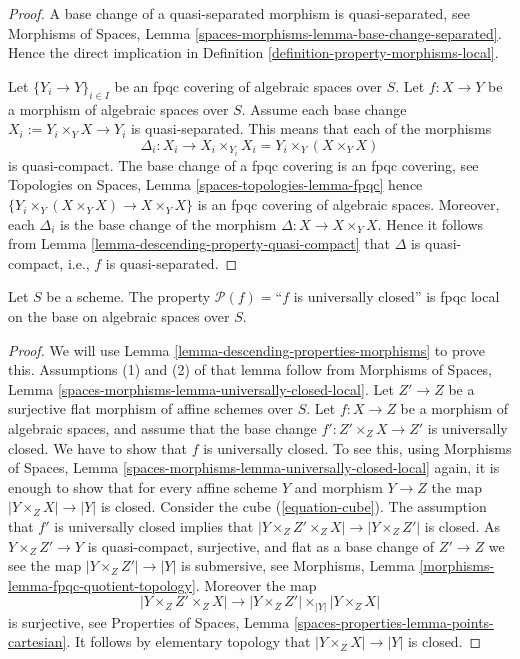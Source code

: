 \begin{proof}
A base change of a quasi-separated morphism is quasi-separated, see
Morphisms of Spaces,
Lemma \ref{spaces-morphisms-lemma-base-change-separated}.
Hence the direct implication in
Definition \ref{definition-property-morphisms-local}.

\medskip\noindent
Let $\{Y_i \to Y\}_{i \in I}$ be an fpqc covering of algebraic spaces over $S$.
Let $f : X \to Y$ be a morphism of algebraic spaces over $S$.
Assume each base change $X_i := Y_i \times_Y X \to Y_i$ is quasi-separated.
This means that each of the morphisms
$$
\Delta_i :
X_i
\longrightarrow
X_i \times_{Y_i} X_i = Y_i \times_Y (X \times_Y X)
$$
is quasi-compact. The base change of a fpqc covering is an fpqc covering, see
Topologies on Spaces, Lemma \ref{spaces-topologies-lemma-fpqc}
hence $\{Y_i \times_Y (X \times_Y X) \to X \times_Y X\}$
is an fpqc covering of algebraic spaces. Moreover, each
$\Delta_i$ is the base change of the morphism
$\Delta : X \to X \times_Y X$. Hence it follows from
Lemma \ref{lemma-descending-property-quasi-compact}
that $\Delta$ is quasi-compact, i.e., $f$ is quasi-separated.
\end{proof}

\begin{lemma}
\label{lemma-descending-property-universally-closed}
Let $S$ be a scheme.
The property $\mathcal{P}(f) =$``$f$ is universally closed''
is fpqc local on the base on algebraic spaces over $S$.
\end{lemma}

\begin{proof}
We will use
Lemma \ref{lemma-descending-properties-morphisms}
to prove this. Assumptions (1) and (2) of that lemma follow from
Morphisms of Spaces,
Lemma \ref{spaces-morphisms-lemma-universally-closed-local}.
Let $Z' \to Z$ be a surjective flat morphism of affine schemes over $S$.
Let $f : X \to Z$ be a morphism of algebraic spaces, and assume
that the base change $f' : Z' \times_Z X \to Z'$ is universally closed.
We have to show that $f$ is universally closed. To see this, using
Morphisms of Spaces,
Lemma \ref{spaces-morphisms-lemma-universally-closed-local}
again, it is enough to show that for every affine scheme $Y$ and
morphism $Y \to Z$ the map $|Y \times_Z X| \to |Y|$ is closed.
Consider the cube (\ref{equation-cube}).
The assumption that $f'$ is universally closed implies that
$|Y \times_Z Z' \times_Z X| \to |Y \times_Z Z'|$ is closed.
As $Y \times_Z Z' \to Y$ is quasi-compact, surjective, and flat
as a base change of $Z' \to Z$
we see the map $|Y \times_Z Z'| \to |Y|$ is submersive, see
Morphisms, Lemma \ref{morphisms-lemma-fpqc-quotient-topology}.
Moreover the map
$$
|Y \times_Z Z' \times_Z X|
\longrightarrow
|Y \times_Z Z'| \times_{|Y|} |Y \times_Z X|
$$
is surjective, see
Properties of Spaces, Lemma \ref{spaces-properties-lemma-points-cartesian}.
It follows by elementary topology that $|Y \times_Z X| \to |Y|$ is closed.
\end{proof}

